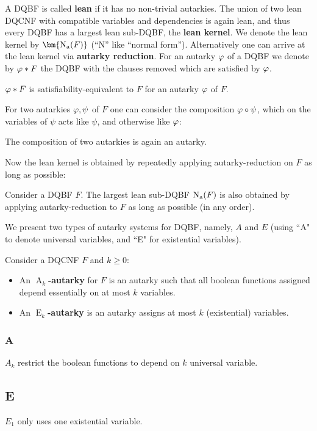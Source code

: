 \documentclass[conference]{IEEEtran}
\DeclareMathOperator{\Aaut}{A}
\DeclareMathOperator{\Eaut}{E}
\begin{document}
A DQBF is called \textbf{lean} if it has no non-trivial autarkies.
The union of two lean DQCNF with compatible variables and dependencies is again lean, and thus every DQBF has a largest lean sub-DQBF, the \textbf{lean kernel}.
We denote the lean kernel by $\bm{\na(F)}$ (``N'' like ``normal form'').
Alternatively one can arrive at the lean kernel via \textbf{autarky reduction}.
For an autarky $\varphi$ of a DQBF we denote by $\varphi * F$ the DQBF with the clauses removed which are satisfied by $\varphi$.
\begin{lem}\label{lem:autsateq}
	$\varphi * F$ is satisfiability-equivalent to $F$ for an autarky $\varphi$ of $F$.
\end{lem}
For two autarkies $\varphi, \psi$ of $F$ one can consider the composition $\varphi \circ \psi$, which on the variables of $\psi$ acts like $\psi$, and otherwise like $\varphi$:
\begin{lem}\label{lem:compaut}
	The composition of two autarkies is again an autarky.
\end{lem}
Now the lean kernel is obtained by repeatedly applying autarky-reduction on $F$ as long as possible:
\begin{lem}\label{lem:decomp}
	Consider a DQBF $F$. The largest lean sub-DQBF $\operatorname{\operatorname{N}_a}(F)$ is also obtained by applying autarky-reduction to $F$ as long as possible (in any order).
\end{lem}

We present two types of autarky systems for DQBF, namely, $A$ and $E$ (using ``A" to denote universal variables, and ``E" for existential variables).

Consider a DQCNF $F$ and $k \ge 0$:
\begin{itemize}
	\item An \textbf{$\Aaut_k$-autarky} for $F$ is an autarky such that all boolean functions assigned depend essentially on at most $k$ variables.
	\item An \textbf{$\Eaut_k$-autarky} is an autarky assigns at most $k$ (existential) variables.
\end{itemize}

\subsubsection{A}
$A_k$ restrict the boolean functions to depend on $k$ universal variable.

\subsection{E}
$E_1$ only uses one existential variable.
\end{document}
